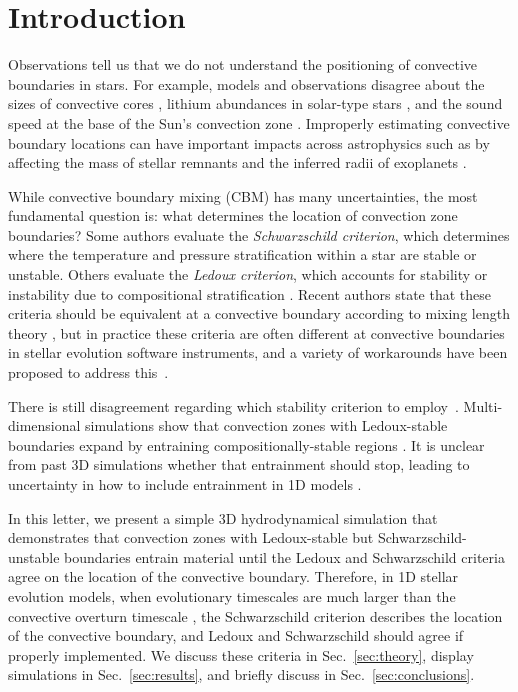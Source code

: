 
\section{Introduction}
\label{sec:introduction}
Observations tell us that we do not understand the positioning of convective boundaries in stars.
For example, models and observations disagree about the sizes of convective cores \citep{claret_torres_2018, viani_basu_2020, pedersen_etal_2021, johnston_2021}, lithium abundances in solar-type stars \citep{pinsonneault_1997, sestito_randich_2005, carlos_etal_2019, dumont_etal_2021}, and the sound speed at the base of the Sun's convection zone \citep[see][Sec.~7.2.1]{basu_2016}.
Improperly estimating convective boundary locations can have important impacts across astrophysics such as by affecting the mass of stellar remnants \citep{farmer_etal_2019, mehta_etal_2022} and the inferred radii of exoplanets \citep{basu_etal_2012, morrell_2020}.

While convective boundary mixing (CBM) has many uncertainties, the most fundamental question is: what determines the location of convection zone boundaries? 
Some authors evaluate the \emph{Schwarzschild criterion}, which determines where the temperature and pressure stratification within a star are stable or unstable.
Others evaluate the \emph{Ledoux criterion}, which accounts for stability or instability due to compositional stratification \citep[e.g., the variation of helium abundance with pressure; see][chapter 3, which reviews these criteria]{salaris_cassisi_2017}.
Recent authors state that these criteria should be equivalent at a convective boundary according to mixing length theory \citep{gabriel_etal_2014, mesa4, mesa5}, but in practice these criteria are often different at convective boundaries in stellar evolution software instruments, and a variety of workarounds have been proposed to address this~\citep{mesa4,mesa5}.

There is still disagreement regarding which stability criterion to employ~\citep[discussed in][chapter 2]{kaiser_etal_2020}.
Multi-dimensional simulations show that convection zones with Ledoux-stable boundaries expand by entraining compositionally-stable regions \citep{meakin_arnett_2007, woodward_etal_2015, jones_etal_2017, cristini_etal_2019, fuentes_cumming_2020, andrassy_etal_2020, andrassy_etal_2021}.
It is unclear from past 3D simulations whether that entrainment should stop, leading to uncertainty in how to include entrainment in 1D models \citep{staritsin_2013, scott_etal_2021}.

In this letter, we present a simple 3D hydrodynamical simulation that demonstrates that convection zones with Ledoux-stable but Schwarzschild-unstable boundaries entrain material until the Ledoux and Schwarzschild criteria agree on the location of the convective boundary.
Therefore, in 1D stellar evolution models, when evolutionary timescales are much larger than the convective overturn timescale \citep[such as on the main sequence, see][]{georgy_etal_2021}, the Schwarzschild criterion describes the location of the convective boundary, and Ledoux and Schwarzschild should agree if properly implemented.
We discuss these criteria in Sec.~\ref{sec:theory}, display simulations in Sec.~\ref{sec:results}, and briefly discuss in Sec.~\ref{sec:conclusions}.
